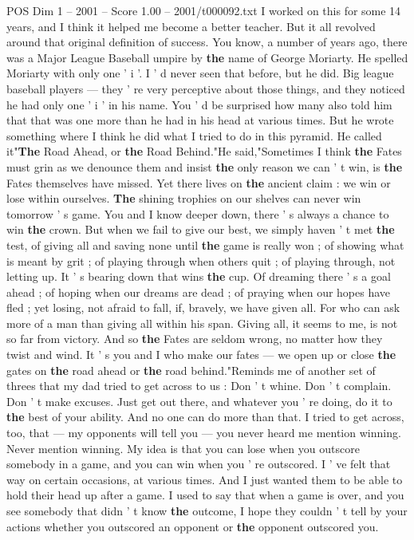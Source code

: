 \begin{textsample}{POS Dim 1 – 2001 – Score 1.00 – 2001/t000092.txt}
I worked on this for some 14 years, and I think it helped me become a better teacher.
But it all revolved around that original definition of success.
You know, a number of years ago, there was a Major League Baseball umpire by \textbf{the} name of George Moriarty.
He spelled Moriarty with only one ' i '.
I ' d never seen that before, but he did.
Big league baseball players — they ' re very perceptive about those things, and they noticed he had only one ' i ' in his name.
You ' d be surprised how many also told him that that was one more than he had in his head at various times.
But he wrote something where I think he did what I tried to do in this pyramid.
He called it"\textbf{The} Road Ahead, or \textbf{the} Road Behind."He said,"Sometimes I think \textbf{the} Fates must grin as we denounce them and insist \textbf{the} only reason we can ' t win, is \textbf{the} Fates themselves have missed.
Yet there lives on \textbf{the} ancient claim : we win or lose within ourselves. \textbf{The} shining trophies on our shelves can never win tomorrow ' s game.
You and I know deeper down, there ' s always a chance to win \textbf{the} crown.
But when we fail to give our best, we simply haven ' t met \textbf{the} test, of giving all and saving none until \textbf{the} game is really won ; of showing what is meant by grit ; of playing through when others quit ; of playing through, not letting up.
It ' s bearing down that wins \textbf{the} cup.
Of dreaming there ' s a goal ahead ; of hoping when our dreams are dead ; of praying when our hopes have fled ; yet losing, not afraid to fall, if, bravely, we have given all.
For who can ask more of a man than giving all within his span.
Giving all, it seems to me, is not so far from victory.
And so \textbf{the} Fates are seldom wrong, no matter how they twist and wind.
It ' s you and I who make our fates — we open up or close \textbf{the} gates on \textbf{the} road ahead or \textbf{the} road behind."Reminds me of another set of threes that my dad tried to get across to us : Don ' t whine.
Don ' t complain.
Don ' t make excuses.
Just get out there, and whatever you ' re doing, do it to \textbf{the} best of your ability.
And no one can do more than that.
I tried to get across, too, that — my opponents will tell you — you never heard me mention winning.
Never mention winning.
My idea is that you can lose when you outscore somebody in a game, and you can win when you ' re outscored.
I ' ve felt that way on certain occasions, at various times.
And I just wanted them to be able to hold their head up after a game.
I used to say that when a game is over, and you see somebody that didn ' t know \textbf{the} outcome, I hope they couldn ' t tell by your actions whether you outscored an opponent or \textbf{the} opponent outscored you.

\end{textsample}
